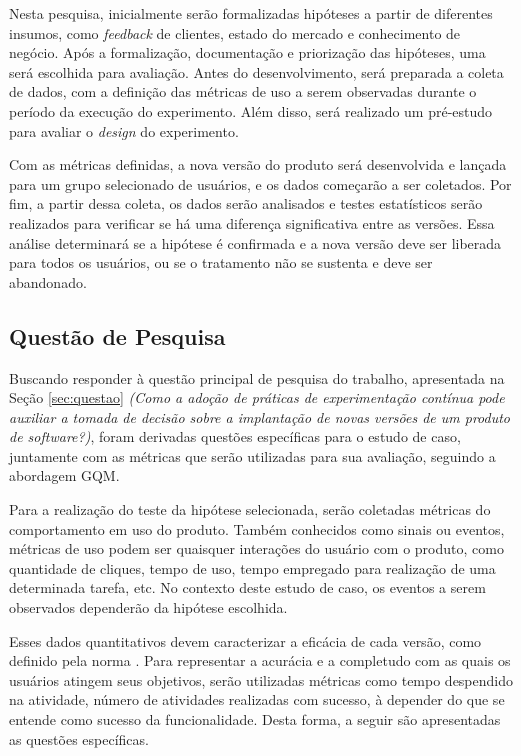 Nesta pesquisa, inicialmente serão formalizadas hipóteses a partir de diferentes insumos, como \textit{feedback} de clientes, estado do mercado e conhecimento de negócio. Após a formalização, documentação e priorização das hipóteses, uma será escolhida para avaliação. Antes do desenvolvimento, será preparada a coleta de dados, com a definição das métricas de uso a serem observadas durante o período da execução do experimento. Além disso, será realizado um pré-estudo para avaliar o \textit{design} do experimento.

Com as métricas definidas, a nova versão do produto será desenvolvida e lançada para um grupo selecionado de usuários, e os dados começarão a ser coletados. Por fim, a partir dessa coleta, os dados serão analisados e testes estatísticos serão realizados para verificar se há uma diferença significativa entre as versões. Essa análise determinará se a hipótese é confirmada e a nova versão deve ser liberada para todos os usuários, ou se o tratamento não se sustenta e deve ser abandonado.


\subsection{Questão de Pesquisa}

Buscando responder à questão principal de pesquisa do trabalho, apresentada na Seção \ref{sec:questao} \textit{(Como a adoção de práticas de experimentação contínua pode auxiliar a tomada de decisão sobre a implantação de novas versões de um produto de software?)}, foram derivadas questões específicas para o estudo de caso, juntamente com as métricas que serão utilizadas para sua avaliação, seguindo a abordagem GQM.

Para a realização do teste da hipótese selecionada, serão coletadas métricas do comportamento em uso do produto. Também conhecidos como sinais ou eventos, métricas de uso podem ser quaisquer interações do usuário com o produto, como quantidade de cliques, tempo de uso, tempo empregado para realização de uma determinada tarefa, etc. No contexto deste estudo de caso, os eventos a serem observados dependerão da hipótese escolhida.

Esses dados quantitativos devem caracterizar a eficácia de cada versão, como definido pela norma . Para representar a acurácia e a completudo com as quais os usuários atingem seus objetivos, serão utilizadas métricas como tempo despendido na atividade, número de atividades realizadas com sucesso, à depender do que se entende como sucesso da funcionalidade. Desta forma, a seguir são apresentadas as questões específicas.

